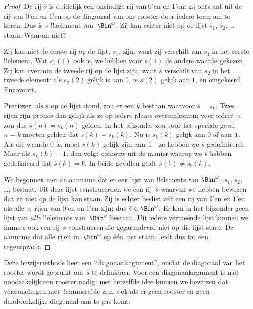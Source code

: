 \documentclass[openany]{memoir}
\begin{document}
\begin{proof}
De rij $\overline{s}$ is duidelijk een oneindige rij van $0$'en en
$1$'en: zij ontstaat uit de rij van $0$'en en $1$'en op de diagonaal
van ons rooster door iedere term om te keren. Dus is $\overline{s}$
!!a{element} van~$\Bin^\omega$. Zij kan echter niet op de lijst $s_1$,
$s_2$, \dots{} staan. Waarom niet?

Zij kan niet de eerste rij op de lijst, $s_1$, zijn, want zij verschilt
van $s_1$ in het eerste !!{element}. Wat $s_1(1)$ ook is, we hebben
voor $\overline{s}(1)$ de andere waarde gekozen. Zij kan evenmin de
tweede rij op de lijst zijn, want $\overline{s}$ verschilt van $s_2$ in
het tweede element: als $s_2(2)$ gelijk is aan $0$, is $\overline{s}(2)$
gelijk aan $1$, en omgekeerd. Enzovoort.

Preciezer: als $\overline{s}$ op de lijst stond, zou er een $k$ bestaan
waarvoor $\overline{s} = s_{k}$. Twee rijen zijn precies dan gelijk als
ze op iedere plaats overeenkomen; voor iedere~$n$ zou dus
$\overline{s}(n) = s_{k}(n)$ gelden. In het bijzonder zou voor het
speciale geval $n = k$ moeten gelden dat $\overline{s}(k) = s_{k}(k)$.
Nu is $s_k(k)$ gelijk aan $0$ of aan~$1$. Als die waarde $0$ is, moet
$\overline{s}(k)$ gelijk zijn aan~$1$---zo hebben we $\overline{s}$
gedefinieerd. Maar als $s_k(k) = 1$, dan volgt opnieuw uit de manier
waarop we $\overline{s}$ hebben gedefinieerd dat $\overline{s}(k) = 0$.
In beide gevallen geldt $\overline{s}(k) \neq
s_{k}(k)$.

We begonnen met de aanname dat er een lijst van !!{element}s van
$\Bin^\omega$, $s_1$, $s_2$, \dots{}, bestaat. Uit deze lijst
construeerden we
een rij~$\overline{s}$ waarvan we hebben bewezen dat zij niet op de
lijst kan staan. Zij is echter beslist zelf een rij van $0$'en en
$1$'en als alle $s_i$ rijen van $0$'en en $1$'en zijn; dus $\overline{s} \in
\Bin^\omega$. Er kan in het bijzonder geen lijst van \emph{alle}
!!{element}s van~$\Bin^\omega$ bestaan. Uit iedere vermeende lijst
kunnen we immers ook een rij~$\overline{s}$ construeren die gegarandeerd
niet op die lijst staat. De aanname dat alle rijen in~$\Bin^\omega$ op
één lijst staan, leidt dus tot een tegenspraak.
\end{proof}

\begin{explain}
Deze bewijsmethode heet een ``diagonaalargument'', omdat de diagonaal van
het rooster wordt gebruikt om~$\overline{s}$ te definiëren. Voor een
diagonaalargument is niet noodzakelijk een rooster nodig: met hetzelfde
idee kunnen we bewijzen dat verzamelingen niet !!{enumerable} zijn, ook
als er geen rooster en geen daadwerkelijke diagonaal aan te pas komt.
\end{explain}
\end{document}
